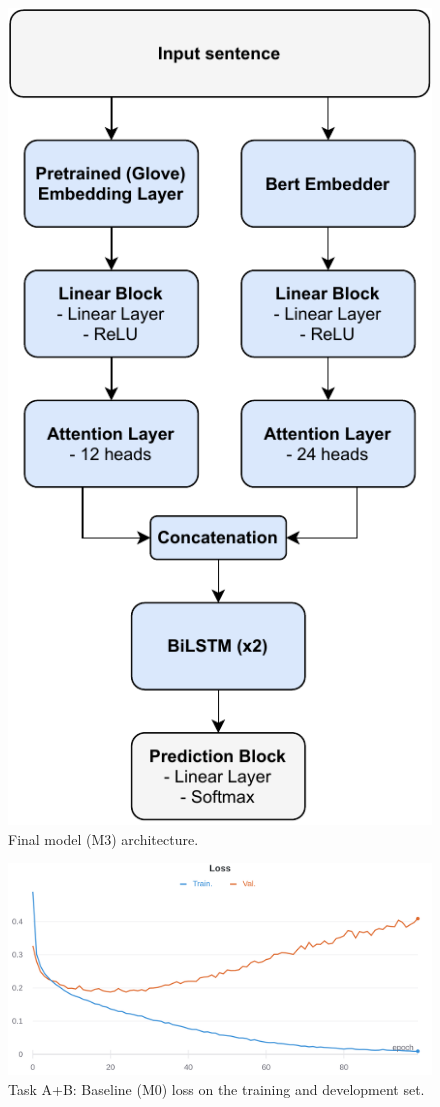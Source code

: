 \documentclass[11pt,a4paper]{article}
\begin{document}
	
	\begin{figure}[H]
		\centering
		\includegraphics[width=0.9\columnwidth]{M3_diagram.pdf}
		\caption{Final model (M3) architecture.}
		\label{fig:M3_architecture}
	\end{figure}
	
	
	
	\begin{figure}[H]
		\centering
		\includegraphics[width=1\columnwidth]{M0_ab_loss.png}
		\caption{Task A+B: Baseline (M0) loss on the training and development set.}
		\label{fig:M0_loss}
	\end{figure}
	
\end{document}
